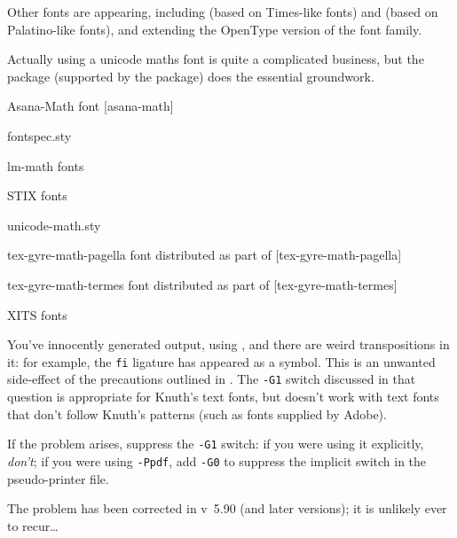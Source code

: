 Other fonts are appearing, including %
 (based on Times-like fonts) and
 (based on Palatino-like fonts),
and  extending the OpenType version of the
 font family.

Actually using a unicode maths font is quite a complicated business,
but the \latex{} package  (supported
by the  package) does the essential groundwork.
\begin{ctanrefs}
\item[Asana-Math \nothtml{\rmfamily}font][asana-math]
\item[fontspec.sty]
\item[lm-math \nothtml{\rmfamily}fonts]
\item[STIX \nothtml{\rmfamily}fonts]
\item[unicode-math.sty]
\item[tex-gyre-math-pagella \nothtml{\rmfamily}font]distributed as
  part of [tex-gyre-math-pagella]
\item[tex-gyre-math-termes \nothtml{\rmfamily}font]distributed as part
  of [tex-gyre-math-termes]
\item[XITS \nothtml{\rmfamily}fonts]
\end{ctanrefs}


You've innocently generated output, using , and there
are weird transpositions in it: for example, the \texttt{fi} ligature has
appeared as a \textsterling{} symbol.
This is an unwanted side-effect of the precautions
outlined in .
The \texttt{-G1} switch discussed in that question is appropriate for
Knuth's text fonts, but doesn't work with text fonts that don't follow
Knuth's patterns (such as fonts supplied by Adobe).

If the problem arises, suppress the \texttt{-G1} switch: if you were using it
explicitly, \emph{don't}; if you were using \texttt{-Ppdf}, add \texttt{-G0} to
suppress the implicit switch in the pseudo-printer file.

The problem has been corrected in  v~5.90 (and later
versions); it is unlikely ever to recur\dots{}

